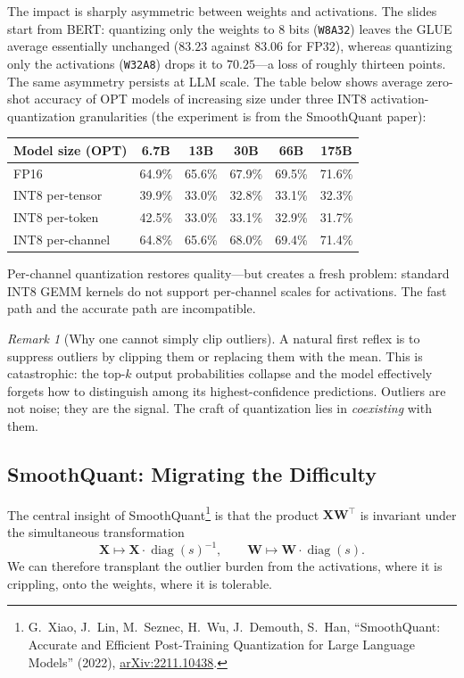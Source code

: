 \documentclass[11pt,a4paper]{article}
\theoremstyle{definition}
\theoremstyle{remark}
\newtheorem*{remark}{Remark}
\theoremstyle{plain}
\newcommand{\arxivlink}[1]{\href{https://arxiv.org/abs/#1}{arXiv:#1}}
\begin{document}
The impact is sharply asymmetric between weights and activations. The
slides start from BERT: quantizing only the weights to 8 bits
(\texttt{W8A32}) leaves the GLUE average essentially unchanged ($83.23$
against $83.06$ for FP32), whereas quantizing only the activations
(\texttt{W32A8}) drops it to $70.25$---a loss of roughly thirteen points.
The same asymmetry persists at LLM scale. The table below shows
average zero-shot accuracy of OPT models of increasing size under three
INT8 activation-quantization granularities (the experiment is from the
SmoothQuant paper):

\begin{center}
\renewcommand{\arraystretch}{1.25}
\begin{tabular}{@{}lccccc@{}}
\toprule
\textbf{Model size (OPT)} & 6.7B & 13B & 30B & 66B & 175B \\
\midrule
FP16                 & 64.9\% & 65.6\% & 67.9\% & 69.5\% & 71.6\% \\
INT8 per-tensor      & 39.9\% & 33.0\% & 32.8\% & 33.1\% & 32.3\% \\
INT8 per-token       & 42.5\% & 33.0\% & 33.1\% & 32.9\% & 31.7\% \\
INT8 per-channel     & 64.8\% & 65.6\% & 68.0\% & 69.4\% & 71.4\% \\
\bottomrule
\end{tabular}
\end{center}

Per-channel quantization restores quality---but creates a fresh problem:
standard INT8 GEMM kernels do not support per-channel scales for
activations. The fast path and the accurate path are incompatible.

\begin{remark}[Why one cannot simply clip outliers]
A natural first reflex is to suppress outliers by clipping them or
replacing them with the mean. This is catastrophic: the top-$k$ output
probabilities collapse and the model effectively forgets how to
distinguish among its highest-confidence predictions. Outliers are not
noise; they are the signal. The craft of quantization lies in
\emph{coexisting} with them.
\end{remark}

\subsection{SmoothQuant: Migrating the Difficulty}

The central insight of SmoothQuant\footnote{G.\ Xiao, J.\ Lin, M.\ Seznec,
H.\ Wu, J.\ Demouth, S.\ Han, ``SmoothQuant: Accurate and Efficient
Post-Training Quantization for Large Language Models'' (2022),
\arxivlink{2211.10438}.} is that the product $\mathbf{X}\mathbf{W}^\top$
is invariant under the simultaneous transformation
\begin{equation}
  \mathbf{X} \mapsto \mathbf{X} \cdot \operatorname{diag}(s)^{-1}, \qquad
  \mathbf{W} \mapsto \mathbf{W} \cdot \operatorname{diag}(s).
  \label{eq:smooth-invariance}
\end{equation}
We can therefore transplant the outlier burden from the activations, where
it is crippling, onto the weights, where it is tolerable.
\end{document}
